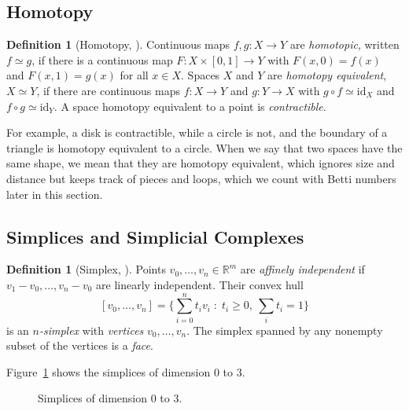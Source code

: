 \documentclass[11pt]{article}
\newcommand{\R}{\mathbb{R}}
\theoremstyle{definition}
\newtheorem{definition}[theorem]{Definition}
\theoremstyle{remark}
\begin{document}
\subsection{Homotopy}
\begin{definition}[Homotopy, {\cite{hatcher2001}}]
Continuous maps $f, g : X \to Y$ are \emph{homotopic}, written $f \simeq g$, if there is a continuous map $F : X \times [0,1] \to Y$ with $F(x,0) = f(x)$ and $F(x,1) = g(x)$ for all $x \in X$.
Spaces $X$ and $Y$ are \emph{homotopy equivalent}, $X \simeq Y$, if there are continuous maps $f : X \to Y$ and $g : Y \to X$ with $g \circ f \simeq \mathrm{id}_X$ and $f \circ g \simeq \mathrm{id}_Y$.
A space homotopy equivalent to a point is \emph{contractible}.
\end{definition}
For example, a disk is contractible, while a circle is not, and the boundary of a triangle is homotopy equivalent to a circle.
When we say that two spaces have the same shape, we mean that they are homotopy equivalent, which ignores size and distance but keeps track of pieces and loops, which we count with Betti numbers later in this section.

\subsection{Simplices and Simplicial Complexes}
\begin{definition}[Simplex, {\cite{hatcher2001}}]
Points $v_0, \dots, v_n \in \R^m$ are \emph{affinely independent} if $v_1 - v_0, \dots, v_n - v_0$ are linearly independent.
Their convex hull
\[
  [v_0, \dots, v_n] = \Big\{ \textstyle\sum_{i=0}^n t_i v_i \;:\; t_i \ge 0,\ \sum_i t_i = 1 \Big\}
\]
is an \emph{$n$-simplex} with \emph{vertices} $v_0, \dots, v_n$.
The simplex spanned by any nonempty subset of the vertices is a \emph{face}.
\end{definition}
Figure~\ref{fig:simplices} shows the simplices of dimension 0 to 3.

\begin{figure}[htbp]
\centering
{}
\caption{Simplices of dimension 0 to 3.}\label{fig:simplices}
\end{figure}
\end{document}
